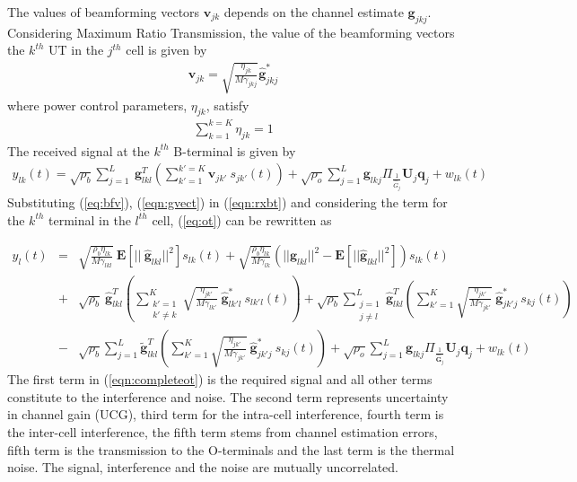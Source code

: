 \documentclass[10pt, a4paper, twoside,fleqn]{article}
\begin{document}
The values of beamforming vectors $\pmb{v}_{jk}$ depends on the channel estimate $\pmb{g}_{jkj}$. Considering Maximum Ratio Transmission, the value of the beamforming vectors the $k^{th}$ UT in the $j^{th}$ cell is given by
\begin{eqnarray}\label{eq:bfv}
	\pmb{v}_{jk} = \sqrt{\frac{\eta_{jk}}{M\gamma_{jkj}}}\pmb{\hat g}^*_{jkj}
\end{eqnarray}
where power control parameters, $\eta_{jk}$, satisfy 
\begin{eqnarray}\label{eqn:etaconstraint}
\sum\limits_{k=1}^{k=K}\eta_{jk}=1
\end{eqnarray}
The received signal at the $k^{th}$ B-terminal is given by
\begin{eqnarray}\label{eqn:rxbt}
    y_{lk}(t) = \sqrt{\rho_b}\sum\limits_{j=1}^{L} \ \pmb{g}_{lkl}^T \left( \sum\limits_{k'=1}^{k'=K}\pmb{v}_{jk'} \ s_{jk'}(t)\right) + \sqrt{\rho_o}\sum_{j=1}^{L}\pmb{g}_{lkj} \Pi_{\frac{1}{\hat G_j}} \pmb{U}_j \pmb{q}_{j}
    + w_{lk}(t) 
\end{eqnarray}
Substituting (\ref{eq:bfv}), (\ref{eqn:gvect}) in (\ref{eqn:rxbt}) and considering the term for the $k^{th}$ terminal in the $l^{th}$ cell, (\ref{eq:ot}) can be rewritten as

\begin{eqnarray} \label{eqn:completeot}
	y_{l}(t)  &=& \sqrt{\frac{\rho_b\eta_{lk}}{M\gamma_{lkl}}} \ \pmb{E}[|| \ \pmb{\hat g}_{lkl}||^2]s_{lk}(t)
	           +  \sqrt{\frac{\rho_b\eta_{lk}}{M\gamma_{lk}}}\left(||\pmb{\hat g}_{lkl}||^2 - \pmb{E}[||\pmb{\hat g}_{lkl}||^2]\right)s_{lk}(t) \nonumber \\    
               &+& \sqrt{\rho_b} \ \pmb{\hat g}_{lkl}^T \left(\sum_{\substack{k'=1 \\ k' \neq k}}^{K} \sqrt{\frac{\eta_{jk'}}{M\gamma_{lk'}}} \ \pmb{\hat g}^*_{lk'l} \ s_{lk'l} (t)\right) 
               + \sqrt{\rho_b} \sum_{\substack{j=1 \\ j \neq l}}^{L} \pmb{\hat g}_{lkl}^T \left(\sum_{k'=1}^{K} \sqrt{\frac{\eta_{jk'}}{M\gamma_{jk'}}} \ \pmb{\hat g}^*_{jk'j} \ s_{kj} (t)\right)\nonumber \\
               &-& \sqrt{\rho_b} \sum_{j=1}^{L} \pmb{\widetilde{g}}_{lkl}^T \left(\sum_{k'=1}^{K} \sqrt{\frac{\eta_{jk'}}{M\gamma_{jk'}}} \ \pmb{\hat g}^*_{jk'j} \ s_{kj} (t)\right) 
               + \sqrt{\rho_o}\sum_{j=1}^{L}\pmb{g}_{lkj} \Pi_{\frac{1}{\pmb{\hat G}_j}} \pmb{U}_j \pmb{q}_{j}
               + w_{lk}(t)      
\end{eqnarray}
The first term in (\ref{eqn:completeot}) is the required signal and all other terms constitute to the interference and noise. The second term represents uncertainty in channel gain (UCG), third term for the intra-cell interference, fourth term is the inter-cell interference, the fifth term stems from channel estimation errors, fifth term is the transmission to the O-terminals and the last term is the thermal noise. The signal, interference and the noise are mutually uncorrelated.
\end{document}
